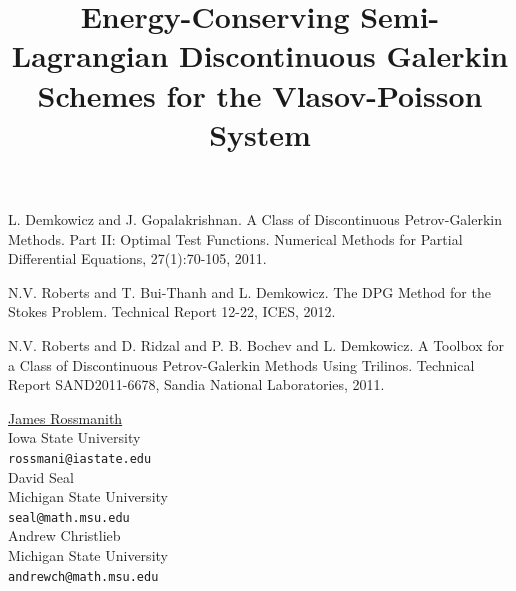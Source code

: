 \documentclass[article,A4,11pt]{llncs}%
\begin{document}

\begin{thebibliography}{10}
{\sc L. Demkowicz and J. Gopalakrishnan}. {A Class of Discontinuous Petrov-Galerkin Methods. Part II: Optimal Test Functions}. Numerical Methods for Partial Differential Equations, 27(1):70-105, 2011.

{\sc N.V. Roberts and T. Bui-Thanh and L. Demkowicz}. {The DPG Method for the Stokes Problem}. Technical Report 12-22, ICES, 2012.

{\sc N.V. Roberts and D. Ridzal and P. B. Bochev and L. Demkowicz}. {A Toolbox for a Class of Discontinuous Petrov-Galerkin Methods Using Trilinos}. Technical Report SAND2011-6678, Sandia National Laboratories, 2011.
\end{thebibliography}

\title{Energy-Conserving Semi-Lagrangian Discontinuous Galerkin Schemes for the Vlasov-Poisson System}
 \author{} \institute{}
\maketitle
\begin{center}
{\large \underline{James Rossmanith}}\\
Iowa State University\\
{\tt rossmani@iastate.edu}
\\ \vspace{4mm}
{\large David Seal}\\
Michigan State University\\
{\tt seal@math.msu.edu}
\\ \vspace{4mm}
{\large Andrew Christlieb}\\
Michigan State University\\
{\tt andrewch@math.msu.edu}
\end{center}
\end{document}
